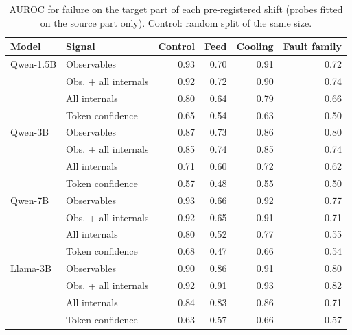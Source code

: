 \begin{table}[!htbp]
\centering
\small
\caption{AUROC for failure on the target part of each pre-registered shift (probes fitted on the source part only). Control: random split of the same size.}
\label{tab:shift}
\begin{tabular}{llrrrr}
\toprule
Model & Signal & Control & Feed & Cooling & Fault family \\
\midrule
Qwen-1.5B & Observables & 0.93 & 0.70 & 0.91 & 0.72 \\
 & Obs. + all internals & 0.92 & 0.72 & 0.90 & 0.74 \\
 & All internals & 0.80 & 0.64 & 0.79 & 0.66 \\
 & Token confidence & 0.65 & 0.54 & 0.63 & 0.50 \\
\midrule
Qwen-3B & Observables & 0.87 & 0.73 & 0.86 & 0.80 \\
 & Obs. + all internals & 0.85 & 0.74 & 0.85 & 0.74 \\
 & All internals & 0.71 & 0.60 & 0.72 & 0.62 \\
 & Token confidence & 0.57 & 0.48 & 0.55 & 0.50 \\
\midrule
Qwen-7B & Observables & 0.93 & 0.66 & 0.92 & 0.77 \\
 & Obs. + all internals & 0.92 & 0.65 & 0.91 & 0.71 \\
 & All internals & 0.80 & 0.52 & 0.77 & 0.55 \\
 & Token confidence & 0.68 & 0.47 & 0.66 & 0.54 \\
\midrule
Llama-3B & Observables & 0.90 & 0.86 & 0.91 & 0.80 \\
 & Obs. + all internals & 0.92 & 0.91 & 0.93 & 0.82 \\
 & All internals & 0.84 & 0.83 & 0.86 & 0.71 \\
 & Token confidence & 0.63 & 0.57 & 0.66 & 0.57 \\
\bottomrule
\end{tabular}
\end{table}
